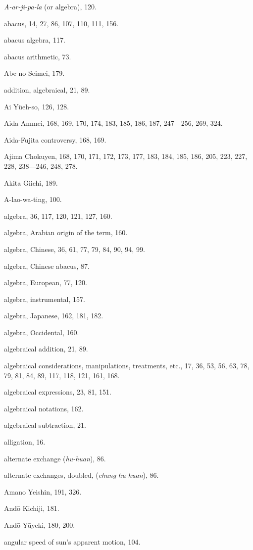 \documentclass[11pt]{article}
\begin{document}
\emph{A-ar-ji-pa-la} (or algebra), 120.\par
abacus, 14, 27, 86, 107, 110, 111, 156.\par
abacus algebra, 117.\par
abacus arithmetic, 73.\par
Abe no Seimei, 179.\par
addition, algebraical, 21, 89.\par
Ai Yüeh-so, 126, 128.\par
Aida Ammei, 168, 169, 170, 174, 183, 185, 186, 187, 247---256, 269, 324.\par
Aida-Fujita controversy, 168, 169.\par
Ajima Chokuyen, 168, 170, 171, 172, 173, 177, 183, 184, 185, 186, 205, 223, 227, 228, 238---246, 248, 278.\par
Akita Giichi, 189.\par
A-lao-wa-ting, 100.\par
algebra, 36, 117, 120, 121, 127, 160.\par
algebra, Arabian origin of the term, 160.\par
algebra, Chinese, 36, 61, 77, 79, 84, 90, 94, 99.\par
algebra, Chinese abacus, 87.\par
algebra, European, 77, 120.\par
algebra, instrumental, 157.\par
algebra, Japanese, 162, 181, 182.\par
algebra, Occidental, 160.\par
algebraical addition, 21, 89.\par
algebraical considerations, manipulations, treatments, etc., 17, 36, 53, 56, 63, 78, 79, 81, 84, 89, 117, 118, 121, 161, 168.\par
algebraical expressions, 23, 81, 151.\par
algebraical notations, 162.\par
algebraical subtraction, 21.\par
alligation, 16.\par
alternate exchange (\emph{hu-huan}), 86.\par
alternate exchanges, doubled, (\emph{chung hu-huan}), 86.\par
Amano Yeishin, 191, 326.\par
Andō Kichiji, 181.\par
Andō Yūyeki, 180, 200.\par
angular speed of sun's apparent motion, 104.\par
\end{document}
